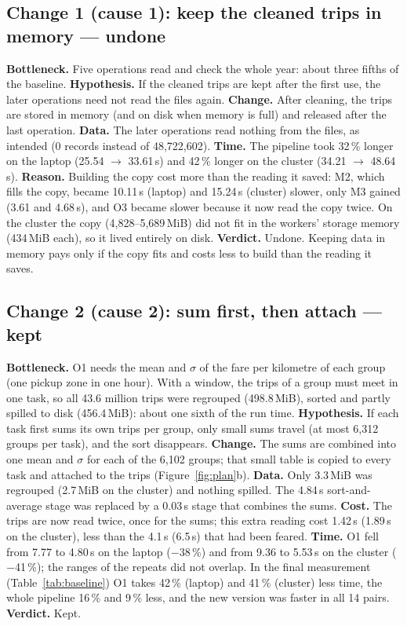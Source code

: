 \documentclass[sigconf]{acmart}
\newcommand{\mib}{\,MiB}
\newcommand{\s}{\,s}
\begin{document}
\subsection{Change 1 (cause 1): keep the cleaned trips in memory --- undone}
\textbf{Bottleneck.} Five operations read and check the whole year: about three fifths of the
baseline. \textbf{Hypothesis.} If the cleaned trips are kept after the first use, the later
operations need not read the files again. \textbf{Change.} After cleaning, the trips are
stored in memory (and on disk when memory is full) and released after the last operation.
\textbf{Data.} The later operations read nothing from the files, as intended (0 records instead
of 48,722,602). \textbf{Time.} The pipeline took 32\,\% longer on the laptop (25.54 $\to$
33.61\s) and 42\,\% longer on the cluster (34.21 $\to$ 48.64\s). \textbf{Reason.} Building
the copy cost more than the reading it saved: M2, which fills the copy, became 10.11\s{}
(laptop) and 15.24\s{} (cluster) slower, only M3 gained (3.61 and 4.68\s), and O3 became slower
because it now read the copy twice. On the cluster the copy (4,828--5,689\mib) did not fit in
the workers' storage memory (434\mib{} each), so it lived entirely on disk. \textbf{Verdict.}
Undone. Keeping data in memory pays only if the copy fits and costs less to build than the
reading it saves.

\subsection{Change 2 (cause 2): sum first, then attach --- kept}
\textbf{Bottleneck.} O1 needs the mean and $\sigma$ of the fare per kilometre of each group
(one pickup zone in one hour). With a window, the trips of a group must meet in one task, so
all 43.6 million trips were regrouped (498.8\mib), sorted and partly spilled to disk
(456.4\mib): about one sixth of the run time. \textbf{Hypothesis.} If each task first sums its
own trips per group, only small sums travel (at most 6,312 groups per task), and the sort
disappears. \textbf{Change.} The sums are combined into one mean and $\sigma$ for each of the
6,102 groups; that small table is copied to every task and attached to the trips
(Figure~\ref{fig:plan}b). \textbf{Data.} Only 3.3\mib{} was regrouped (2.7\mib{} on the
cluster) and nothing spilled. The 4.84\s{} sort-and-average stage was replaced by a 0.03\s{}
stage that combines the sums. \textbf{Cost.} The trips are now read twice, once for the sums;
this extra reading cost 1.42\s{} (1.89\s{} on the cluster), less than the 4.1\s{} (6.5\s)
that had been feared. \textbf{Time.} O1 fell from 7.77 to 4.80\s{} on the laptop
($-$38\,\%) and from 9.36 to 5.53\s{} on the cluster ($-$41\,\%); the ranges of the repeats
did not overlap. In the final measurement (Table~\ref{tab:baseline}) O1 takes 42\,\% (laptop)
and 41\,\% (cluster) less time, the whole pipeline 16\,\% and 9\,\% less, and the new version
was faster in all 14 pairs. \textbf{Verdict.} Kept.
\end{document}
